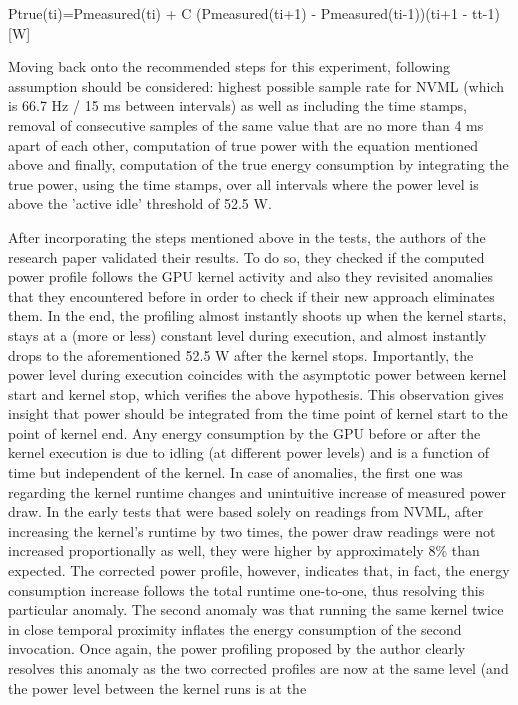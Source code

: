 Ptrue(ti)=Pmeasured(ti) + C  (Pmeasured(ti+1) - Pmeasured(ti-1))(ti+1 - tt-1)    [W]

Moving back onto the recommended steps for this experiment,
following assumption should be considered: highest possible sample
rate for NVML (which is 66.7 Hz / 15 ms between intervals) as well
as including the time stamps, removal of consecutive samples of
the same value that are no more than 4 ms apart of each other,
computation of true power with the equation mentioned above and
finally, computation of the true energy consumption by integrating
the true power, using the time stamps, over all intervals where
the power level is above the 'active idle' threshold of 52.5 W.

After incorporating the steps mentioned above in the tests, the
authors of the research paper validated their results. To do so,
they checked if the computed power profile follows the GPU kernel
activity and also they revisited anomalies that they encountered
before in order to check if their new approach eliminates them.
In the end, the profiling almost instantly shoots up when the
kernel starts, stays at a (more or less) constant level during
execution, and almost instantly drops to the aforementioned 52.5 W
after the kernel stops. Importantly, the power level during
execution coincides with the asymptotic power between kernel start
and kernel stop, which verifies the above hypothesis. This
observation gives insight that power should be integrated from the
time point of kernel start to the point of kernel end. Any energy
consumption by the GPU before or after the kernel execution is due
to idling (at different power levels) and is a function of time
but independent of the kernel. In case of anomalies, the first one
was regarding the kernel runtime changes and unintuitive increase
of measured power draw. In the early tests that were based solely
on readings from NVML, after increasing the kernel's runtime by
two times, the power draw readings were not increased
proportionally as well, they were higher by approximately 8\% than
expected. The corrected power profile, however, indicates that, in
fact, the energy consumption increase follows the total runtime
one-to-one, thus resolving this particular anomaly. The second
anomaly was that running the same kernel twice in close temporal
proximity inflates the energy consumption of the second invocation.
Once again, the power profiling proposed by the author clearly
resolves this anomaly as the two corrected profiles are now at the
same level (and the power level between the kernel runs is at the
